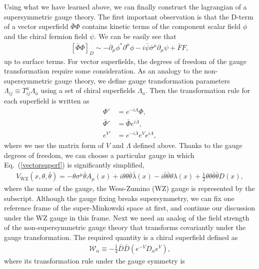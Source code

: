 \documentclass[12pt,twoside,book]{article}
\begin{document}
Using what we have learned above, we can finally construct the lagrangian of a supersymmetric gauge theory.
The first important observation is that the D-term of a vector superfield $\bar{\Phi} \Phi$ contains kinetic terms of the component scalar field $\phi$ and the chiral fermion field $\psi$.
We can be easily see that
\begin{align}
  \left[ \bar{\Phi} \Phi \right]_D \sim -\partial_\mu \phi^{*}
  \partial^\mu \phi -i \bar{\psi} \bar{\sigma}^\mu \partial_\mu \psi + \bar{F}F,
\end{align}
up to surface terms.
For vector superfields, the degrees of freedom of the gauge transformation require some consideration.
As an analogy to the non-supersymmetric gauge theory, we define gauge transformation parameters $\Lambda_{i j} \equiv T^a_{i j} \Lambda_a$ using a set of chiral superfields $\Lambda_a$.
Then the transformation rule for each superfield is written as
\begin{align}
  \Phi' &= e^{-i\Lambda} \Phi,\label{chiralsfgaugetransf} \\
  \bar{\Phi}' &= \bar{\Phi} e^{i\bar{\Lambda}},  \\
  e^{V'} &= e^{-i\bar{\Lambda}} e^V e^{i\Lambda},
  \label{vectorsfgaugetransf}
\end{align}
where we use the matrix form of $V$ and $\Lambda$ defined above.
Thanks to the gauge degrees of freedom, we can choose a particular gauge in which Eq.\ (\ref{vectorsuperf}) is significantly simplified,
\begin{align}
  V_{\mathrm{WZ}} (x,\theta,\bar{\theta}) = -\theta \sigma^\mu \bar{\theta}
  A_\mu(x) + i\theta\theta \bar{\theta} \bar{\lambda}(x) -
  i\bar{\theta} \bar{\theta} \theta \lambda(x) + \frac{1}{2}
  \theta\theta \bar{\theta} \bar{\theta} D(x),
\end{align}
where the name of the gauge, the Wess-Zumino (WZ) gauge \cite{Wess:1974jb} is represented by the subscript.
Although the gauge fixing breaks supersymmetry, we can fix one reference frame of the super-Minkowski space at first, and continue our discussion under the WZ gauge in this frame.
Next we need an analog of the field strength of the non-supersymmetric gauge theory that transforms covariantly under the gauge transformation.
The required quantity is a chiral superfield defined as
\begin{align}
  \mathcal{W}_\alpha \equiv -\frac{1}{4} \bar{D} \bar{D} (e^{-V} D_\alpha e^V),
\end{align}
where its transformation rule under the gauge symmetry is
\end{document}
